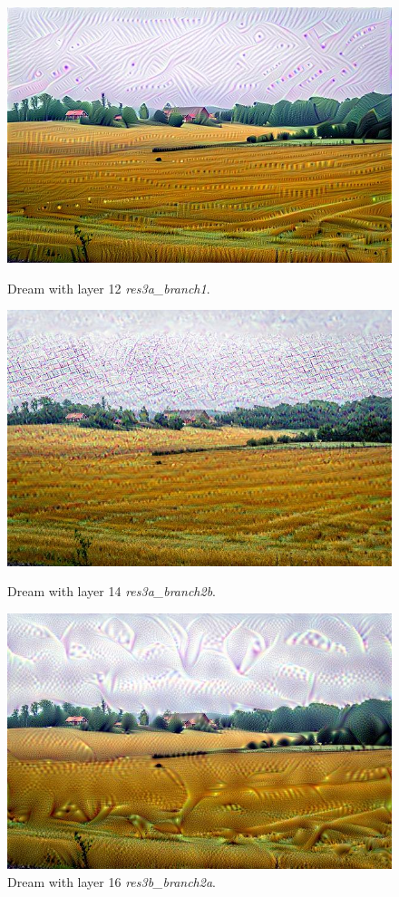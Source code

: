\begin{figure}[H]
	\centering
	\includegraphics[width=1\linewidth]{img/alpsted-landscape_res3a_branch1.jpg}
	\caption{Dream with layer 12 \emph{res3a\_branch1}.}
	\label{fig:layer-artistic}
	\endminipage\hfill
	\centering
	\includegraphics[width=1\linewidth]{img/14_alpsted-landscape_res3a_branch2b.jpg}
	\caption{Dream with layer 14 \emph{res3a\_branch2b}.}
	\label{fig:14-landscape}
	\endminipage\hfill
	\centering
	\includegraphics[width=1\linewidth]{img/16_alpsted-landscape_res3b_branch2a.jpg}
	\caption{Dream with layer 16 \emph{res3b\_branch2a}.}
	\label{fig:16-landscape}
	\endminipage\hfill
\end{figure}


